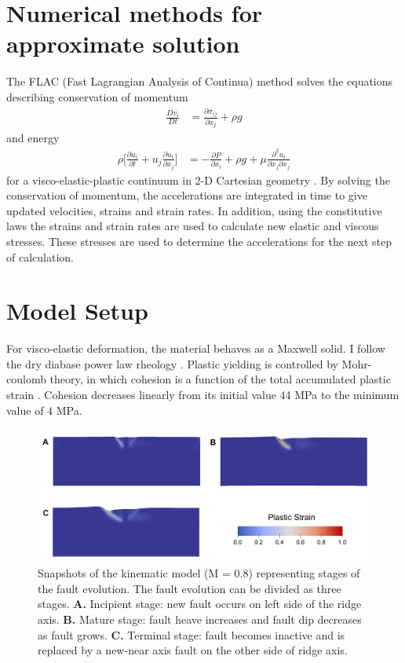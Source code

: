 \documentclass[letterpaper,12pt,notitle]{memphisthesis}                     %
\begin{document}
\section{Numerical methods for approximate solution}
The FLAC (Fast Lagrangian Analysis of Continua) method \citep{Cundall1982, Poliakov1993} solves the equations describing conservation of momentum
\begin{align}
 \frac{D v_i}{D t} & = \frac{\partial \sigma_{ij}}{\partial x_{j}} + \rho g
\end{align}
\noindent and energy
\begin{align}
 \rho \bigg[ \frac{\partial u_i}{\partial t} + u_j\frac{\partial u_i}{\partial x_j} \bigg] & = -\frac{\partial P}{\partial x_{i}} + \rho g + \mu \frac{\partial^2 u_i}{\partial x_j \partial x_j}
\end{align}
\noindent for a visco-elastic-plastic continuum in 2-D Cartesian geometry \citep{Lavier2002}. By solving the conservation of momentum, the accelerations are integrated in time to give updated velocities, strains and strain rates. In addition, using the constitutive laws the strains and strain rates are used to calculate new elastic and viscous stresses. These stresses are used to determine the accelerations for the next step of calculation.


\section{Model Setup}
For visco-elastic deformation, the material behaves as a Maxwell solid. I follow the dry diabase power law rheology \citep{Kirby1987, Chen1990}. Plastic yielding is controlled by Mohr-coulomb theory, in which cohesion is a function of the total accumulated plastic strain \citep{Poliakov1998}. Cohesion decreases linearly from its initial value 44 MPa to the minimum value of 4 MPa.

\begin{figure}[!htb]
	\centering
	\includegraphics[width=0.9\linewidth]{./figs/fault_stage.pdf}
	\caption{ Snapshots of the kinematic model (M = 0.8) representing stages of the fault evolution. The fault evolution can be divided as three stages. \textbf{A.} Incipient stage: new fault occurs on left side of the ridge axis.  \textbf{B.} Mature stage: fault heave increases and fault dip decreases as fault grows. \textbf{C.} Terminal stage: fault becomes inactive and is replaced by a new-near axis fault on the other side of ridge axis.}
	\label{fig:faultstage}
\end{figure}
\end{document}
